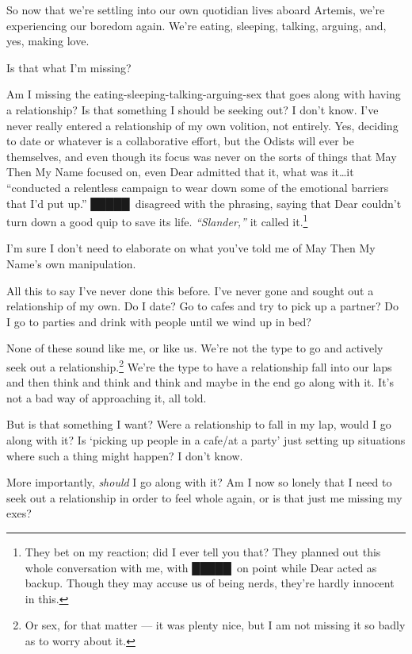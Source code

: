 So now that we're settling into our own quotidian lives aboard Artemis, we're experiencing our boredom again. We're eating, sleeping, talking, arguing, and, yes, making love.

Is that what I'm missing?

Am I missing the eating-sleeping-talking-arguing-sex that goes along with having a relationship? Is that something I should be seeking out? I don't know. I've never really entered a relationship of my own volition, not entirely. Yes, deciding to date or whatever is a collaborative effort, but the Odists will ever be themselves, and even though its focus was never on the sorts of things that May Then My Name focused on, even Dear admitted that it, what was it\ldots it ``conducted a relentless campaign to wear down some of the emotional barriers that I'd put up.'' █████\ disagreed with the phrasing, saying that Dear couldn't turn down a good quip to save its life. \emph{``Slander,''} it called it.\footnote{They bet on my reaction; did I ever tell you that? They planned out this whole conversation with me, with █████\ on point while Dear acted as backup. Though they may accuse us of being nerds, they're hardly innocent in this.}

I'm sure I don't need to elaborate on what you've told me of May Then My Name's own manipulation.

All this to say I've never done this before. I've never gone and sought out a relationship of my own. Do I date? Go to cafes and try to pick up a partner? Do I go to parties and drink with people until we wind up in bed?

None of these sound like me, or like us. We're not the type to go and actively seek out a relationship.\footnote{Or sex, for that matter — it was plenty nice, but I am not missing it so badly as to worry about it.} We're the type to have a relationship fall into our laps and then think and think and think and maybe in the end go along with it. It's not a bad way of approaching it, all told.

But is that something I want? Were a relationship to fall in my lap, would I go along with it? Is `picking up people in a cafe/at a party' just setting up situations where such a thing might happen? I don't know.

More importantly, \emph{should} I go along with it? Am I now so lonely that I need to seek out a relationship in order to feel whole again, or is that just me missing my exes?

